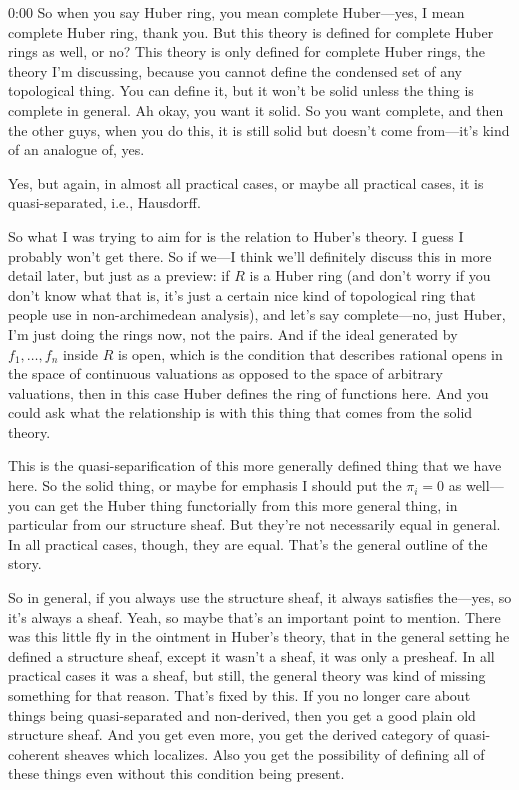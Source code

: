 \begin{unfinished}{0:00}
So when you say Huber ring, you mean complete Huber---yes, I mean complete Huber ring, thank you. But this theory is defined for complete Huber rings as well, or no? This theory is only defined for complete Huber rings, the theory I'm discussing, because you cannot define the condensed set of any topological thing. You can define it, but it won't be solid unless the thing is complete in general. Ah okay, you want it solid. So you want complete, and then the other guys, when you do this, it is still solid but doesn't come from---it's kind of an analogue of, yes.

Yes, but again, in almost all practical cases, or maybe all practical cases, it is quasi-separated, i.e., Hausdorff.

So what I was trying to aim for is the relation to Huber's theory. I guess I probably won't get there. So if we---I think we'll definitely discuss this in more detail later, but just as a preview: if $R$ is a Huber ring (and don't worry if you don't know what that is, it's just a certain nice kind of topological ring that people use in non-archimedean analysis), and let's say complete---no, just Huber, I'm just doing the rings now, not the pairs. And if the ideal generated by $f_1, \ldots, f_n$ inside $R$ is open, which is the condition that describes rational opens in the space of continuous valuations as opposed to the space of arbitrary valuations, then in this case Huber defines the ring of functions here. And you could ask what the relationship is with this thing that comes from the solid theory.

This is the quasi-separification of this more generally defined thing that we have here. So the solid thing, or maybe for emphasis I should put the $\pi_i = 0$ as well---you can get the Huber thing functorially from this more general thing, in particular from our structure sheaf. But they're not necessarily equal in general. In all practical cases, though, they are equal. That's the general outline of the story.

So in general, if you always use the structure sheaf, it always satisfies the---yes, so it's always a sheaf. Yeah, so maybe that's an important point to mention. There was this little fly in the ointment in Huber's theory, that in the general setting he defined a structure sheaf, except it wasn't a sheaf, it was only a presheaf. In all practical cases it was a sheaf, but still, the general theory was kind of missing something for that reason. That's fixed by this. If you no longer care about things being quasi-separated and non-derived, then you get a good plain old structure sheaf. And you get even more, you get the derived category of quasi-coherent sheaves which localizes. Also you get the possibility of defining all of these things even without this condition being present.


\end{unfinished}
